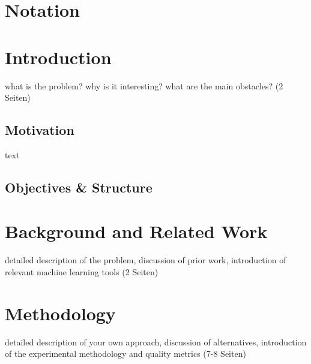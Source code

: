 \documentclass[
     12pt,         %
     a4paper,      %
     DIV=14,        %
     ]{scrreprt}
\begin{document}
{\let\clearpage\relax\chapter*{Notation}}


\newpage

\tableofcontents
\cleardoublepage
{} 



\chapter{Introduction}
\label{chap:intro}
what is the problem? why is it interesting? what are the main obstacles? (2 Seiten)

\section{Motivation}
\alert{text}

\section{Objectives \& Structure}


\newpage


\chapter{Background and Related Work}
\label{chap:background}

detailed description of the problem, discussion of prior work, introduction of relevant machine learning tools (2 Seiten)

\chapter{Methodology}
\label{chap:methodology}
detailed description of your own approach, discussion of alternatives, introduction of the experimental methodology and quality metrics (7-8 Seiten)
\end{document}
